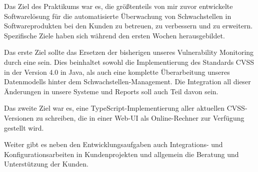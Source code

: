 Das Ziel des Praktikums war es, die größtenteils von mir zuvor entwickelte Softwarelösung für die automatisierte Überwachung von Schwachstellen in Softwareprodukten bei den Kunden zu betreuen, zu verbessern und zu erweitern.
Spezifische Ziele haben sich während den ersten Wochen herausgebildet.

Das erste Ziel sollte das Ersetzen der bisherigen  unseres Vulnerability Monitoring durch eine  sein.
Dies beinhaltet sowohl die Implementierung des Standards CVSS in der Version 4.0 in Java, als auch eine komplette Überarbeitung unseres Datenmodells hinter dem Schwachstellen-Management.
Die Integration all dieser Änderungen in unsere Systeme und Reports soll auch Teil davon sein.

Das zweite Ziel war es, eine TypeScript-Implementierung aller aktuellen CVSS-Versionen zu schreiben, die in einer Web-UI als Online-Rechner zur Verfügung gestellt wird.

Weiter gibt es neben den Entwicklungsaufgaben auch Integrations- und Konfigurationsarbeiten in Kundenprojekten und allgemein die Beratung und Unterstützung der Kunden.
